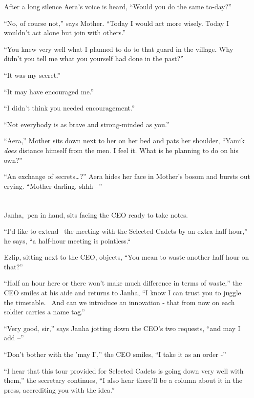 \documentclass[twoside,11pt]{book}
\begin{document}
After a long silence Aera's voice is heard, ``Would you do the same to-day?''

``No, of course not,'' says Mother. ``Today I would act more wisely. Today I
wouldn't act alone but join with others.''

``You knew very well what I planned to do to that guard in the village. Why didn't you tell me what you
yourself had done in the past?''

``It was my secret.''

``It may have encouraged me.''

``I didn't think you needed encouragement.''

``Not everybody is as brave and strong-minded as you.''

``Aera,'' Mother sits down next to her on her bed and pats her shoulder, ``Yamik
\textit{does} distance himself from the men. I feel it. What is he planning to do on his own?''

``An exchange of secrets{\dots}?'' Aera hides her face in Mother's bosom and bursts out
crying. ``Mother darling, shhh --''


\bigskip

\chapter{}

Janha,~pen in hand, sits facing the CEO ready to take notes.

``I'd like to extend \ the meeting with the Selected Cadets by an extra half hour,'' he says,
``a half-hour meeting is pointless.``{ }

Ezlip, sitting next to the CEO, objects, ``You mean to waste another half hour on that?''

``Half an hour here or there won't make much difference in terms of waste,'' the CEO smiles at
his aide and returns to Janha, ``I know I can trust you to juggle the timetable. ~And can we introduce an
innovation - that from now on each soldier{ }carries a name tag.''

``Very good, sir,'' says Janha jotting down the CEO's two requests, ``and may I add --''

``Don't bother with the 'may I','' the CEO smiles, ``I take it{
}as an order -''

``I hear that this tour provided for Selected Cadets is going down very well with them,'' the
secretary continues, ``I also hear there'll be a column about it in the press, accrediting you with the
idea.''
\end{document}
